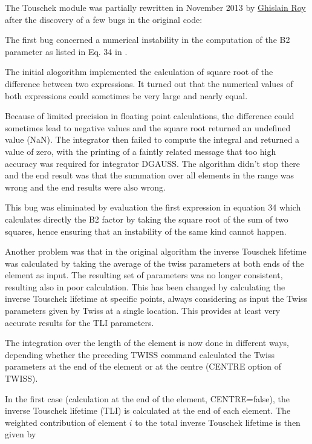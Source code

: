 The \madx Touschek module was partially rewritten in November 2013 by
\href{mailto:ghislain.roy@cern.ch}{Ghislain Roy}  
after the discovery of a few bugs in the original code:

The first bug concerned a numerical instability in the computation of
the B2 parameter as listed in Eq. 34 in \cite{Piwinski1998}.

The initial alogorithm implemented the calculation of square root of the
difference between two expressions. It turned out that the numerical
values of both expressions could sometimes be very large and nearly
equal.
  
Because of limited precision in floating point calculations, the
difference could sometimes lead to negative values  
and the square root returned an undefined value (NaN). 
The integrator then failed to compute the integral and returned a value
of zero, with the printing of a faintly related  
message that too high accuracy was required for integrator DGAUSS. 
The algorithm didn't stop there and the end result was that the
summation over all elements in the range was wrong 
and the end results were also wrong.

This bug was eliminated by evaluation the first expression in equation
34 which calculates directly the B2 factor by taking the square root of
the sum of two squares, hence ensuring that an instability of the same
kind cannot happen.  

Another problem was that in the original algorithm the inverse Touschek
lifetime was calculated by taking the average of the twiss parameters at
both ends of the element as input. The resulting set of parameters was
no longer consistent, resulting also in poor calculation. This has been
changed by calculating the inverse Touschek lifetime at specific points,  
always considering as input the Twiss parameters given by Twiss at a
single location. This provides at least very accurate results for the
TLI parameters. 

The integration over the length of the element is now done in different
ways, depending whether the preceding TWISS command calculated the Twiss
parameters at the end of the element or at the centre (CENTRE option of
TWISS).  

In the first case (calculation at the end of the element, CENTRE=false), 
the inverse Touschek lifetime (TLI) is calculated at the end of each
element. The weighted contribution of element $i$ to the total inverse
Touschek lifetime is then given by 

